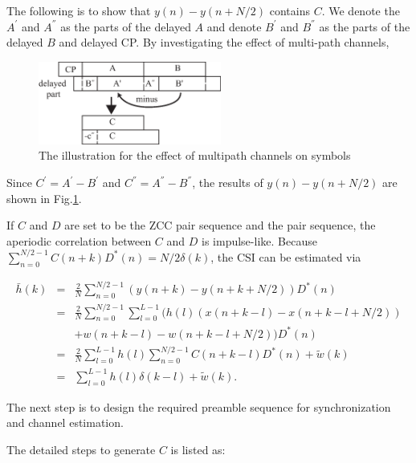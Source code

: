 \documentclass[journal]{IEEEtran}
\begin{document}
	The following is to show that $ y(n)-y(n+N/2) $ contains $ C $.
	We denote the $A^{'}$ and $A^{''}$ as the parts of the delayed $A$ and denote  $B^{'}$ and $B^{''}$ as the parts of the delayed $B$ and delayed CP.
	By investigating the effect of multi-path channels,
	\begin{figure}[htb]
		\centering \includegraphics[width=6cm]{effect_of_channel_ACO_OFDM.eps}
		\caption{The illustration for the effect of multipath channels on symbols} \label{fig:effect_of_channel_ACO_OFDM}
	\end{figure}
	Since $C^{'}=A^{'}-B^{'}$ and $C^{''}=A^{''}-B^{''}$, the results of $y(n)-y(n+N/2)$ are shown in Fig.\ref{fig:effect_of_channel_ACO_OFDM}.
	
	If $C$ and $D$ are set to be the ZCC pair sequence and the pair sequence, the aperiodic correlation between $C$ and $D$ is impulse-like.
	Because $ \sum_{n=0}^{N/2-1}C(n+k)D^*(n)=N/2 \delta(k) $, the CSI can be estimated via
	\begin{small}
	\begin{eqnarray}\label{equ:gain_acquire}
          \bar{h}(k)&=&\frac{2}{N}\sum_{n=0}^{N/2-1}(y(n+k)-y(n+k+N/2))D^*(n)\nonumber\\
          &=&\frac{2}{N}\sum_{n=0}^{N/2-1}\sum_{l=0}^{L-1}(h(l)(x(n+k-l)-x(n+k-l+N/2))\nonumber\\
          &&+w(n+k-l)-w(n+k-l+N/2))D^*(n)\nonumber\\
          &=&\frac{2}{N}\sum_{l=0}^{L-1}h(l)\sum_{n=0}^{N/2-1}C(n+k-l)D^*(n)+\tilde{w}(k)\nonumber\\
          &=&\sum_{l=0}^{L-1}h(l)\delta(k-l)+\tilde{w}(k).
    \end{eqnarray}
	\end{small}

    The next step is to design the required preamble sequence for synchronization and channel estimation. %

	The detailed steps to generate $ C $ is listed as:
\end{document}
